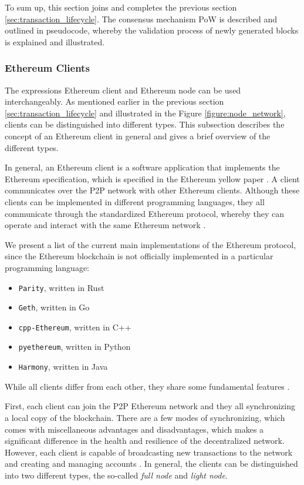 To sum up, this section joins and completes the previous section \ref{sec:transaction_lifecycle}.
The consensus mechanism PoW is described and outlined in pseudocode, whereby
the validation process of newly generated blocks is explained and illustrated.
\clearpage

\subsubsection{Ethereum Clients}
\label{sec:nodes}

The expressions Ethereum client and Ethereum node can be used interchangeably. 
As mentioned earlier in the previous section \ref{sec:transaction_lifecycle} 
and illustrated in the Figure \ref{figure:node_network}, clients can be distinguished into different types. 
This subsection describes the concept of an Ethereum client in general and gives a brief overview of the different
types.

In general, an Ethereum client is a software application 
that implements the Ethereum specification, which is specified in the Ethereum yellow paper .
A client communicates over the P2P network with other Ethereum clients.
Although these clients can be implemented in different programming languages, they all communicate through
the standardized Ethereum protocol, whereby they can operate and interact with the same Ethereum network . 

We present a list of the current main implementations of the Ethereum protocol,
since the Ethereum blockchain is not officially implemented in a particular programming language:

\begin{itemize}
	\item \texttt{Parity}, written in Rust
	\item \texttt{Geth}, written in Go
	\item \texttt{cpp-Ethereum}, written in C++
	\item \texttt{pyethereum}, written in Python
	\item \texttt{Harmony}, written in Java 
\end{itemize}

While all clients differ from each other, they share some fundamental features .

First, each client can join the P2P Ethereum network and they all synchronizing a local copy of the blockchain.
There are a few modes of synchronizing, which comes with miscellaneous advantages and disadvantages, 
which makes a significant difference in the health and resilience of the decentralized network.
However, each client is capable of broadcasting new transactions to the network and creating and 
managing accounts .
In general, the clients can be distinguished into two different types, the so-called \textit{full node} and 
\textit{light node}. 

